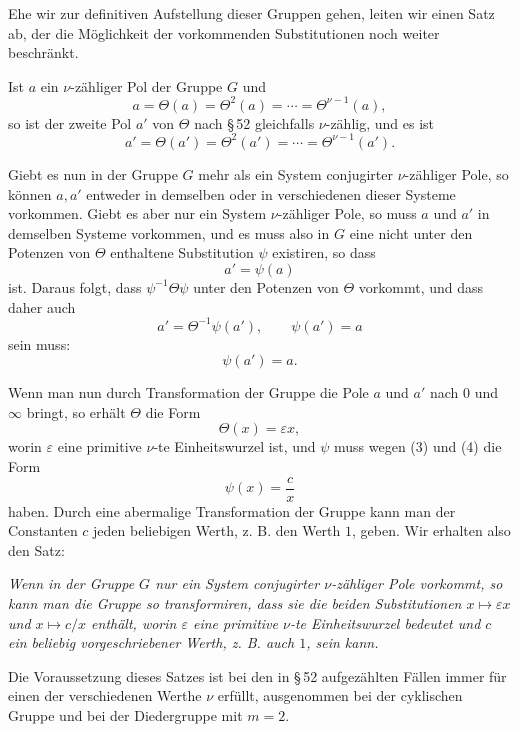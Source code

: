\documentclass[11pt]{article}
\providecommand{\eps}{\varepsilon}
\providecommand{\eps}{\varepsilon}
\begin{document}
Ehe wir zur definitiven Aufstellung dieser Gruppen gehen, leiten wir einen Satz ab, der die Möglichkeit der vorkommenden Substitutionen noch weiter beschränkt.

Ist $a$ ein $\nu$-zähliger Pol der Gruppe $G$ und
\begin{equation}
a=\Theta(a)=\Theta^2(a)=\cdots=\Theta^{\nu-1}(a),
\tag{1}
\end{equation}
so ist der zweite Pol $a'$ von $\Theta$ nach \S\,52 gleichfalls $\nu$-zählig, und es ist
\begin{equation}
a'=\Theta(a')=\Theta^2(a')=\cdots=\Theta^{\nu-1}(a').
\tag{2}
\end{equation}

Giebt es nun in der Gruppe $G$ mehr als ein System conjugirter $\nu$-zähliger Pole, so können $a,a'$ entweder in demselben oder in verschiedenen dieser Systeme vorkommen. Giebt es aber nur ein System $\nu$-zähliger Pole, so muss $a$ und $a'$ in demselben Systeme vorkommen, und es muss also in $G$ eine nicht unter den Potenzen von $\Theta$ enthaltene Substitution $\psi$ existiren, so dass
\begin{equation}
a'=\psi(a)
\tag{3}
\end{equation}
ist. Daraus folgt, dass $\psi^{-1}\Theta\psi$ unter den Potenzen von $\Theta$ vorkommt, und dass daher auch
\[
a'=\Theta^{-1}\psi(a'),\qquad \psi(a')=a
\]
sein muss:
\begin{equation}
\psi(a')=a.
\tag{4}
\end{equation}

Wenn man nun durch Transformation der Gruppe die Pole $a$ und $a'$ nach $0$ und $\infty$ bringt, so erhält $\Theta$ die Form
\[
\Theta(x)=\eps x,
\]
worin $\eps$ eine primitive $\nu$-te Einheitswurzel ist, und $\psi$ muss wegen (3) und (4) die Form
\[
\psi(x)=\frac c x
\]
haben. Durch eine abermalige Transformation der Gruppe kann man der Constanten $c$ jeden beliebigen Werth, z. B. den Werth $1$, geben. Wir erhalten also den Satz:

\emph{Wenn in der Gruppe $G$ nur ein System conjugirter $\nu$-zähliger Pole vorkommt, so kann man die Gruppe so transformiren, dass sie die beiden Substitutionen $x\mapsto \eps x$ und $x\mapsto c/x$ enthält, worin $\eps$ eine primitive $\nu$-te Einheitswurzel bedeutet und $c$ ein beliebig vorgeschriebener Werth, z. B. auch $1$, sein kann.}

Die Voraussetzung dieses Satzes ist bei den in \S\,52 aufgezählten Fällen immer für einen der verschiedenen Werthe $\nu$ erfüllt, ausgenommen bei der cyklischen Gruppe und bei der Diedergruppe mit $m=2$.
\end{document}
